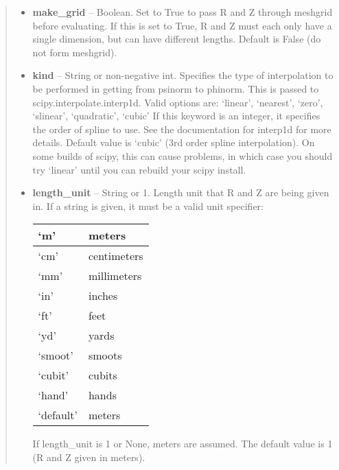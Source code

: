 \documentclass[letterpaper,10pt,english]{sphinxmanual}
\begin{document}
\begin{fulllineitems}
\begin{fulllineitems}
\begin{quote}
\begin{description}
\begin{itemize}
\item {} 
\textbf{make\_grid} --
Boolean.
Set to True to pass R and Z through meshgrid
before evaluating. If this is set to True, R and Z must each
only have a single dimension, but can have different lengths.
Default is False (do not form meshgrid).

\item {} 
\textbf{kind} --
String or non-negative int.
Specifies the type of interpolation
to be performed in getting from psinorm to phinorm. This is
passed to scipy.interpolate.interp1d. Valid options are:
`linear', `nearest', `zero', `slinear', `quadratic', `cubic'
If this keyword is an integer, it specifies the order of spline
to use. See the documentation for interp1d for more details.
Default value is `cubic' (3rd order spline interpolation). On
some builds of scipy, this can cause problems, in which case
you should try `linear' until you can rebuild your scipy install.

\item {} 
\textbf{length\_unit} --
String or 1.
Length unit that R and Z are being given
in. If a string is given, it must be a valid unit specifier:

\begin{tabulary}{\linewidth}{|L|L|}
\hline

`m'
 & 
meters
\\\hline

`cm'
 & 
centimeters
\\\hline

`mm'
 & 
millimeters
\\\hline

`in'
 & 
inches
\\\hline

`ft'
 & 
feet
\\\hline

`yd'
 & 
yards
\\\hline

`smoot'
 & 
smoots
\\\hline

`cubit'
 & 
cubits
\\\hline

`hand'
 & 
hands
\\\hline

`default'
 & 
meters
\\\hline
\end{tabulary}


If length\_unit is 1 or None, meters are assumed. The default
value is 1 (R and Z given in meters).


\end{itemize}
\end{description}
\end{quote}
\end{fulllineitems}
\end{fulllineitems}
\end{document}
